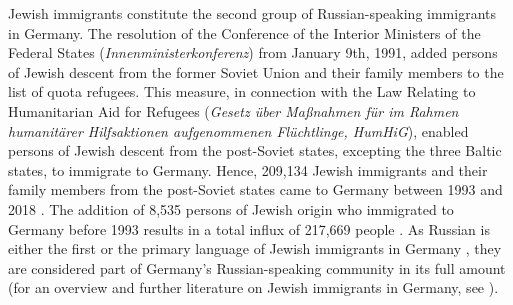 Jewish immigrants constitute the second group of Russian-speaking immigrants in Germany. The resolution of the Conference of the Interior Ministers of the Federal States (\textit{Innenministerkonferenz}) from January 9th, 1991, added persons of Jewish descent from the former Soviet Union and their family members to the list of quota refugees. This measure, in connection with the Law Relating to Humanitarian Aid for Refugees (\textit{Gesetz über Maßnahmen für im Rahmen humanitärer Hilfsaktionen aufgenommenen Flüchtlinge, HumHiG}), enabled persons of Jewish descent from the post-Soviet states, excepting the three Baltic states, to immigrate to Germany. Hence, 209,134 Jewish immigrants and their family members from the post-Soviet states came to Germany between 1993 and 2018 \citep[96]{bamf}. The addition of 8,535 persons of Jewish origin who immigrated to Germany before 1993 results in a total influx of 217,669 people \citep[]{bamf}. As Russian is either the first or the primary language of Jewish immigrants in Germany \citep[cf.][166]{brehmer07}, they are considered part of Germany's Russian-speaking community in its full amount (for an overview and further literature on Jewish immigrants in Germany, see \citealt{remennickTA}). 

